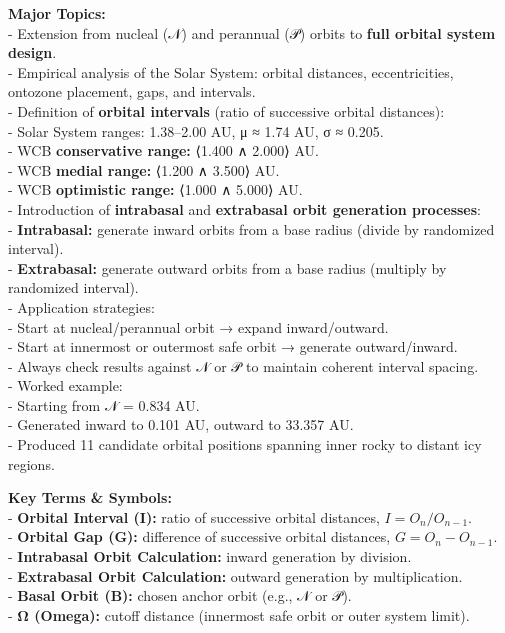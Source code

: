 \documentclass[
  letterpaper,
]{book}
\begin{document}
\textbf{Major Topics:}\\
- Extension from nucleal (𝒩) and perannual (𝒫) orbits to \textbf{full
orbital system design}.\\
- Empirical analysis of the Solar System: orbital distances,
eccentricities, ontozone placement, gaps, and intervals.\\
- Definition of \textbf{orbital intervals} (ratio of successive orbital
distances):\\
- Solar System ranges: 1.38--2.00 AU, μ ≈ 1.74 AU, σ ≈ 0.205.\\
- WCB \textbf{conservative range:} ⟨1.400 ∧ 2.000⟩ AU.\\
- WCB \textbf{medial range:} ⟨1.200 ∧ 3.500⟩ AU.\\
- WCB \textbf{optimistic range:} ⟨1.000 ∧ 5.000⟩ AU.\\
- Introduction of \textbf{intrabasal} and \textbf{extrabasal orbit
generation processes}:\\
- \textbf{Intrabasal:} generate inward orbits from a base radius (divide
by randomized interval).\\
- \textbf{Extrabasal:} generate outward orbits from a base radius
(multiply by randomized interval).\\
- Application strategies:\\
- Start at nucleal/perannual orbit → expand inward/outward.\\
- Start at innermost or outermost safe orbit → generate
outward/inward.\\
- Always check results against 𝒩 or 𝒫 to maintain coherent interval
spacing.\\
- Worked example:\\
- Starting from 𝒩 = 0.834 AU.\\
- Generated inward to 0.101 AU, outward to 33.357 AU.\\
- Produced 11 candidate orbital positions spanning inner rocky to
distant icy regions.

\textbf{Key Terms \& Symbols:}\\
- \textbf{Orbital Interval (I):} ratio of successive orbital distances,
\(I = O_n / O_{n-1}\).\\
- \textbf{Orbital Gap (G):} difference of successive orbital distances,
\(G = O_n - O_{n-1}\).\\
- \textbf{Intrabasal Orbit Calculation:} inward generation by
division.\\
- \textbf{Extrabasal Orbit Calculation:} outward generation by
multiplication.\\
- \textbf{Basal Orbit (B):} chosen anchor orbit (e.g., 𝒩 or 𝒫).\\
- \textbf{Ω (Omega):} cutoff distance (innermost safe orbit or outer
system limit).
\end{document}
